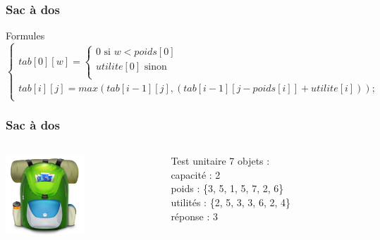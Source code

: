 \documentclass[french]{beamer}
\begin{document}
  
  \begin{frame}
    \frametitle{Sac à dos}
    \begin{alertblock}{Formules}
      \begin{equation}
        \begin{cases}
          tab[0][w] = 
          \begin{cases} 
            \text{0 si } w < poids[0] \\
            utilite[0] \text{ sinon} \\
          \end{cases} \\

          tab[i][j] = max(tab[i-1] [j], (tab[i-1] [j-poids[i]] + utilite[i])); \\
        \end{cases}
      \end{equation}
    \end{alertblock}
  \end{frame}

\begin{frame}
  \frametitle{Sac à dos}
  \begin{columns}
    \begin{column}[]{3cm}
      \begin{center}
        \includegraphics[height=3cm]{Knapsack.png}
      \end{center}
    \end{column}
      \begin{column}[]{7cm}
        \begin{block}{Test unitaire}
		7 objets : \\
		capacité : 2\\
		poids : \{3, 5, 1, 5, 7, 2, 6\} \\
		utilités : \{2, 5, 3, 3, 6, 2, 4\} \\
		réponse : 3 \\
        \end{block}
      \end{column}
    \end{columns}
  \end{frame}
\end{document}
